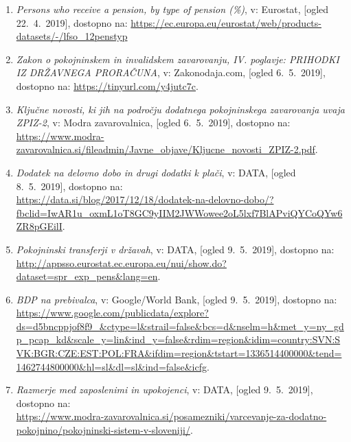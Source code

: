 \documentclass[12pt, a4paper]{article}
\begin{document}
\begin{enumerate}
\item
\label{Eurostat pokojnine procentualno}
\emph{Persons who receive a pension, by type of pension (\%)}, v: Eurostat, [ogled 22.~4.~2019], dostopno na: \url{https://ec.europa.eu/eurostat/web/products-datasets/-/lfso_12penstyp}

\item
\label{ZPIZ2}
\emph{Zakon o pokojninskem in invalidskem zavarovanju, IV. poglavje: PRIHODKI IZ DRŽAVNEGA PRORAČUNA}, v: Zakonodaja.com, [ogled 6.~5.~2019], dostopno na: \url{https://tinyurl.com/y4jutc7c}.

\item
\label{Novosti ZIPZ2}
\emph{Ključne novosti, ki jih na področju dodatnega pokojninskega zavarovanja uvaja ZPIZ-2}, v: Modra zavarovalnica, [ogled 6.~5.~2019], dostopno na: \url{https://www.modra-zavarovalnica.si/fileadmin/Javne_objave/Kljucne_novosti_ZPIZ-2.pdf}.

\item
\label{Dodatek na delovno dobo in drugi dodatki k plači}
\emph{Dodatek na delovno dobo in drugi dodatki k plači}, v: DATA, [ogled 8.~5.~2019], dostopno na:\\ \url{https://data.si/blog/2017/12/18/dodatek-na-delovno-dobo/?fbclid=IwAR1u_oxmL1oT8GC9yIIM2JWWowee2oL5lxf7BlAPviQYCoQYw6ZR8pGEilI}.



\item
\label{Pokojninski transferji v državah}
\emph{Pokojninski transferji v državah}, v: DATA, [ogled 9.~5.~2019], dostopno na:\\ \url{http://appsso.eurostat.ec.europa.eu/nui/show.do?dataset=spr_exp_pens&lang=en}.

\item
\label{BDP na prebivalca}
\emph{BDP na prebivalca}, v: Google/World Bank, [ogled 9.~5.~2019], dostopno na:\\ \url{https://www.google.com/publicdata/explore?ds=d5bncppjof8f9_&ctype=l&strail=false&bcs=d&nselm=h&met_y=ny_gdp_pcap_kd&scale_y=lin&ind_y=false&rdim=region&idim=country:SVN:SVK:BGR:CZE:EST:POL:FRA&ifdim=region&tstart=1336514400000&tend=1462744800000&hl=sl&dl=sl&ind=false&icfg}.

\item
\label{Razmerje med zaposlenimi in upokojenci}
\emph{Razmerje med zaposlenimi in upokojenci}, v: DATA, [ogled 9.~5.~2019], dostopno na:\\ \url{https://www.modra-zavarovalnica.si/posamezniki/varcevanje-za-dodatno-pokojnino/pokojninski-sistem-v-sloveniji/}.
\end{enumerate}
\end{document}
